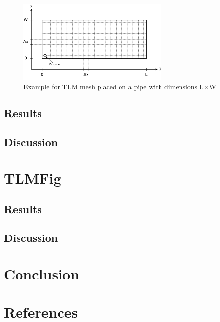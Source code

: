 \documentclass[twocolumn]{article}
\begin{document}
\begin{figure}[H]
    \centering
    \includegraphics[width=75mm]{./Images/tlm_pipe.png}
    \caption{Example for TLM mesh placed on a pipe with dimensions L$\times$W}
    \label{fig_tlm_mesh}
\end{figure}


\subsection{Results}

\subsection{Discussion}

\section{TLMFig}
\subsection{Results}

\subsection{Discussion}

\section{Conclusion}

\section{References}

\small


\end{document}
